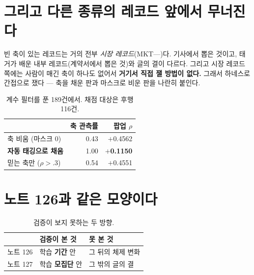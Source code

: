 \documentclass[10pt]{article}
\begin{document}
\section{그리고 다른 종류의 레코드 앞에서 무너진다}

빈 축이 있는 레코드는 거의 전부 \emph{시장 레코드}(MKT---)다. 기사에서
뽑은 것이고, 태거가 배운 내부 레코드(계약서에서 뽑은 것)와 글의 결이 다르다.
그리고 시장 레코드 쪽에는 사람이 매긴 축이 하나도 없어서 \textbf{거기서
직접 잴 방법이 없다.} 그래서 하네스로 간접으로 쟀다 --- 축을 채운 판과
마스크로 비운 판을 나란히 붙인다.

\begin{table}[t]
\centering\tsize
\caption{계수 필터를 푼 189건에서. 채점 대상은 후행 116건.}
\begin{tabular}{lrr}
\toprule
& 축 관측률 & 팝업 $\rho$ \\
\midrule
축 비움 (마스크 0) & 0.43 & $+$0.4562 \\
\textbf{자동 태깅으로 채움} & 1.00 & \textbf{$+$0.1150} \\
믿는 축만 ($\rho>.3$) & 0.54 & $+$0.4551 \\
\bottomrule
\end{tabular}
\end{table}



\section{노트 126과 같은 모양이다}

\begin{table}[t]
\centering\tsize
\caption{검증이 보지 못하는 두 방향.}
\begin{tabular}{lll}
\toprule
& 검증이 본 것 & 못 본 것 \\
\midrule
노트 126 & 학습 \textbf{기간} 안 & 그 뒤의 체제 변화 \\
노트 127 & 학습 \textbf{모집단} 안 & 그 밖의 글의 결 \\
\bottomrule
\end{tabular}
\end{table}
\end{document}
